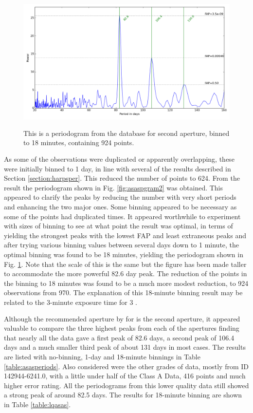 \begin{figure}[!htbp]
\begin{center}
\includegraphics[scale=0.50]{Figures/asasbin18min.png} \\
\end{center}
\caption{This is a periodogram from the {\asas} database for {\prox} second aperture, binned to 18 minutes, containing 924 points.}
\protect\label{fig:asaspgram3}
\end{figure}

As some of the observations were duplicated or apparently overlapping, these were initially binned to 1 day, in line
with several of the {\harps} results described in Section \ref{section:harpsper}. This reduced the number of points to
624. From the result the periodogram shown in Fig. \ref{fig:asaspgram2} was obtained. This appeared to clarify the peaks
by reducing the number with very short periods and enhancing the two major ones. Some binning appeared to be necessary
as some of the points had duplicated times. It appeared worthwhile to experiment with sizes of binning to see at what
point the result was optimal, in terms of yielding the strongest peaks with the lowest FAP and least extraneous peaks
and after trying various binning values between several days down to 1 minute, the optimal binning was found to be 18
minutes, yielding the periodogram shown in Fig. \ref{fig:asaspgram3}. Note that the scale of this is the same but the
figure has been made taller to accommodate the more powerful 82.6 day peak. The reduction of the points in the binning
to 18 minutes was found to be a much more modest reduction, to 924 observations from 970. The explanation of this
18-minute binning result may be related to the 3-minute exposure time for {\asas} 3 \citep{pojmanski01}.

Although the recommended aperture by {\asas} for {\prox} is the second aperture, it appeared valuable to compare the
three highest peaks from each of the apertures finding that nearly all the data gave a first peak of 82.6 days, a second
peak of 106.4 days and a much smaller third peak of about 131 days in most cases. The results are listed with
no-binning, 1-day and 18-minute binnings in Table \ref{table:asasperiods}. Also considered were the other grades of
{\asas} data, mostly from ID 142944-6241.0, with a little under half of the Class A Data, 416 points and much higher
error rating. All the periodograms from this lower quality data still showed a strong peak of around 82.5 days. The
results for 18-minute binning are shown in Table \ref{table:lqasas}.

